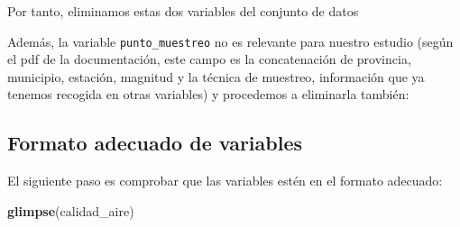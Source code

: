 \documentclass[]{article}
\newenvironment{Shaded}{\begin{snugshade}}{\end{snugshade}}
\newcommand{\KeywordTok}[1]{\textcolor[rgb]{0.13,0.29,0.53}{\textbf{#1}}}
\newcommand{\NormalTok}[1]{#1}
\newcommand{\OperatorTok}[1]{\textcolor[rgb]{0.81,0.36,0.00}{\textbf{#1}}}
\newcommand{\OtherTok}[1]{\textcolor[rgb]{0.56,0.35,0.01}{#1}}
\newcommand{\StringTok}[1]{\textcolor[rgb]{0.31,0.60,0.02}{#1}}
\begin{document}
Por tanto, eliminamos estas dos variables del conjunto de datos

\begin{Shaded}
\end{Shaded}

Además, la variable \texttt{punto\_muestreo} no es relevante para
nuestro estudio (según el pdf de la documentación, este campo es la
concatenación de provincia, municipio, estación, magnitud y la técnica
de muestreo, información que ya tenemos recogida en otras variables) y
procedemos a eliminarla también:

\begin{Shaded}
\end{Shaded}

\hypertarget{formato-adecuado-de-variables}{%
\subsection{Formato adecuado de
variables}\label{formato-adecuado-de-variables}}

El siguiente paso es comprobar que las variables estén en el formato
adecuado:

\begin{Shaded}
\begin{Highlighting}[]
\KeywordTok{glimpse}\NormalTok{(calidad_aire)}
\end{Highlighting}
\end{Shaded}
\end{document}
